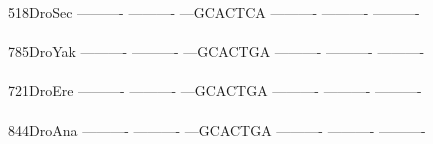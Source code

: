 \documentclass[11pt,twoside,reqno,a4paper]{article}
\begin{document}
{518\hspace*{2\charwidth}DroSec	----------	----------	---GCACTCA	----------	----------	----------	\\
\hspace*{5\charwidth}\hspace*{7\charwidth}\hspace*{1\charwidth}\hspace*{1\charwidth}\hspace*{1\charwidth}\hspace*{1\charwidth}\hspace*{1\charwidth}\hspace*{1\charwidth}\\
785\hspace*{2\charwidth}DroYak	----------	----------	---GCACTGA	----------	----------	----------	\\
\hspace*{5\charwidth}\hspace*{7\charwidth}\hspace*{1\charwidth}\hspace*{1\charwidth}\hspace*{1\charwidth}\hspace*{1\charwidth}\hspace*{1\charwidth}\hspace*{1\charwidth}\\
721\hspace*{2\charwidth}DroEre	----------	----------	---GCACTGA	----------	----------	----------	\\
\hspace*{5\charwidth}\hspace*{7\charwidth}\hspace*{1\charwidth}\hspace*{1\charwidth}\hspace*{1\charwidth}\hspace*{1\charwidth}\hspace*{1\charwidth}\hspace*{1\charwidth}\\
844\hspace*{2\charwidth}DroAna	----------	----------	---GCACTGA	----------	----------	----------	\\
\hspace*{5\charwidth}\hspace*{7\charwidth}\hspace*{1\charwidth}\hspace*{1\charwidth}\hspace*{1\charwidth}\hspace*{1\charwidth}\hspace*{1\charwidth}\hspace*{1\charwidth}\\
}
\end{document}

